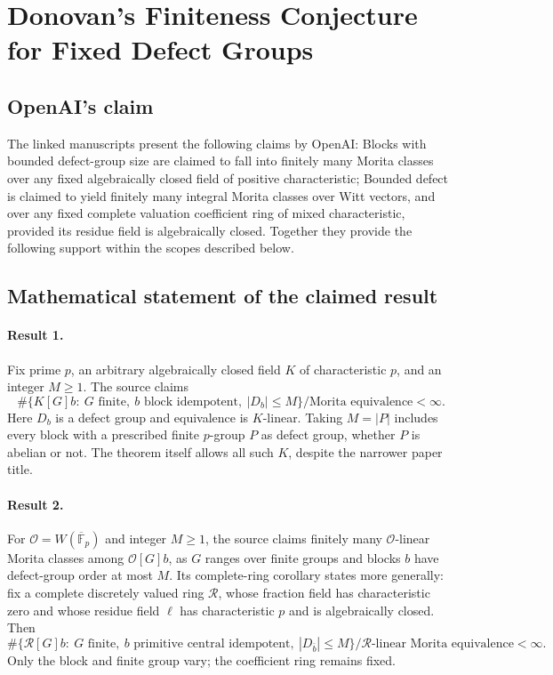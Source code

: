 \documentclass[11pt]{article}
\begin{document}
\section*{Donovan’s Finiteness Conjecture for Fixed Defect Groups}

\subsection{OpenAI's claim}
The linked manuscripts present the following claims by OpenAI: Blocks with bounded defect-group size are claimed to fall into finitely many Morita classes over any fixed algebraically closed field of positive characteristic; Bounded defect is claimed to yield finitely many integral Morita classes over Witt vectors, and over any fixed complete valuation coefficient ring of mixed characteristic, provided its residue field is algebraically closed. Together they provide the following support within the scopes described below.

\subsection{Mathematical statement of the claimed result}
\paragraph{Result 1.} Fix prime \(p\), an arbitrary algebraically closed field \(K\) of characteristic \(p\), and an integer \(M\ge1\). The source claims
\[
 \#\{K[G]b:\ G\text{ finite},\ b\text{ block idempotent},\ |D_b|\le M\}/\text{Morita equivalence}<\infty.
\]
Here \(D_b\) is a defect group and equivalence is \(K\)-linear. Taking \(M=|P|\) includes every block with a prescribed finite \(p\)-group \(P\) as defect group, whether \(P\) is abelian or not. The theorem itself allows all such \(K\), despite the narrower paper title.

\paragraph{Result 2.} For \(\mathcal O=W(\overline{\mathbb F}_p)\) and integer \(M\ge1\), the source claims finitely many \(\mathcal O\)-linear Morita classes among \(\mathcal O[G]b\), as \(G\) ranges over finite groups and blocks \(b\) have defect-group order at most \(M\). Its complete-ring corollary states more generally: fix a complete discretely valued ring \(\mathcal R\), whose fraction field has characteristic zero and whose residue field \(\ell\) has characteristic \(p\) and is algebraically closed. Then
\[
 \#\{\mathcal R[G]b:\ G\text{ finite},\ b\text{ primitive central idempotent},\ |D_{\bar b}|\le M\}/\mathcal R\text{-linear Morita equivalence}<\infty.
\]
Only the block and finite group vary; the coefficient ring remains fixed.
\end{document}
